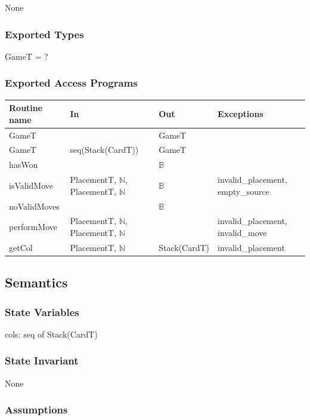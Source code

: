 \documentclass[12pt]{article}
\begin{document}
None

\subsubsection*{Exported Types}

GameT = ?

\subsubsection*{Exported Access Programs}

\begin{tabular}{|l|>{\raggedright\arraybackslash}p{3.9cm}|l|p{3.5cm}|}
\hline
\textbf{Routine name} & \textbf{In} & \textbf{Out} & \textbf{Exceptions}\\
\hline
GameT & ~ & GameT & ~\\
\hline
GameT & seq(Stack(CardT)) & GameT & ~\\
\hline
hasWon & ~ & $\mathbb{B}$ & ~\\
\hline
isValidMove & PlacementT, $\mathbb{N}$, PlacementT, $\mathbb{N}$
            & $\mathbb{B}$ & invalid\_placement, empty\_source\\
\hline
noValidMoves & ~ & $\mathbb{B}$ & ~\\
\hline
performMove & PlacementT, $\mathbb{N}$, PlacementT, $\mathbb{N}$
            & ~ & invalid\_placement, invalid\_move\\
\hline
getCol & PlacementT, $\mathbb{N}$ & Stack(CardT) & invalid\_placement\\
\hline
\end{tabular}

\subsection*{Semantics}

\subsubsection*{State Variables}

cols: seq of Stack(CardT)

\subsubsection*{State Invariant}

None

\subsubsection*{Assumptions}
\end{document}
